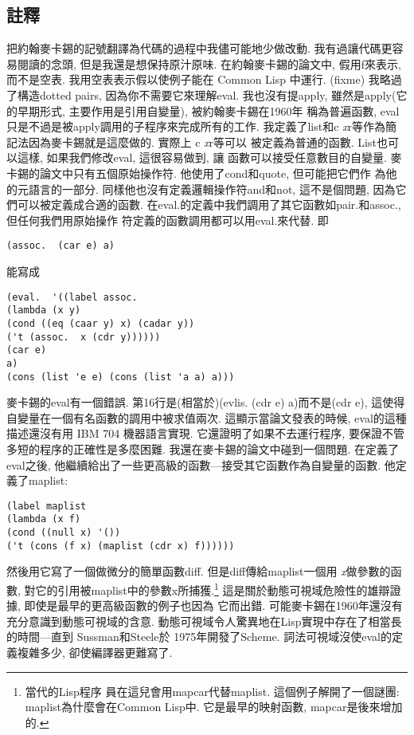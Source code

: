 \documentclass[12pt]{article}
\begin{document}
\begin{CJK}{UTF8}{bsmi}
\section{註釋} 
把約翰麥卡錫的記號翻譯為代碼的過程中我儘可能地少做改動. 
我有過讓代碼更容易閱讀的念頭, 
但是我還是想保持原汁原味. 
在約翰麥卡錫的論文中, 假用f來表示, 
而不是空表. 
我用空表表示假以使例子能在
Common Lisp 中運行. 
(fixme) 
我略過了構造dotted 
pairs, 
因為你不需要它來理解eval. 
我也沒有提apply, 
雖然是apply(它的早期形式, 
主要作用是引用自變量), 
被約翰麥卡錫在1960年 
稱為普遍函數, 
eval只是不過是被apply調用的子程序來完成所有的工作. 
我定義了list和c{\it 
x}r等作為簡記法因為麥卡錫就是這麼做的. 
實際上 
c{\it 
x}r等可以 
被定義為普通的函數. 
List也可以這樣, 
如果我們修改eval, 
這很容易做到, 
讓 
函數可以接受任意數目的自變量. 
麥卡錫的論文中只有五個原始操作符. 
他使用了cond和quote, 但可能把它們作 
為他的元語言的一部分. 
同樣他也沒有定義邏輯操作符and和not, 
這不是個問題, 
因為它們可以被定義成合適的函數. 
在eval.的定義中我們調用了其它函數如pair.和assoc., 但任何我們用原始操作 
符定義的函數調用都可以用eval.來代替. 
即 
\begin{verbatim} 
(assoc.  (car e) a) 
\end{verbatim} 
能寫成 
\begin{verbatim} 
(eval.  '((label assoc. 
(lambda (x y) 
(cond ((eq (caar y) x) (cadar y)) 
('t (assoc.  x (cdr y)))))) 
(car e) 
a) 
(cons (list 'e e) (cons (list 'a a) a))) 
\end{verbatim} 
麥卡錫的eval有一個錯誤. 
第16行是(相當於)(evlis.  (cdr e) a)而不是(cdr e), 
這使得自變量在一個有名函數的調用中被求值兩次. 
這顯示當論文發表的時候, 
eval的這種描述還沒有用 IBM 704 機器語言實現. 
它還證明了如果不去運行程序, 
要保證不管多短的程序的正確性是多麼困難. 
我還在麥卡錫的論文中碰到一個問題. 
在定義了eval之後, 
他繼續給出了一些更高級的函數---接受其它函數作為自變量的函數. 
他定義了maplist: 
\begin{verbatim} 
(label maplist 
(lambda (x f) 
(cond ((null x) '()) 
('t (cons (f x) (maplist (cdr x) f)))))) 
\end{verbatim} 
然後用它寫了一個做微分的簡單函數diff. 
但是diff傳給maplist一個用{\it 
x}做參數的函數, 
對它的引用被maplist中的參數x所捕獲.\footnote{當代的Lisp程序 
員在這兒會用mapcar代替maplist. 
這個例子解開了一個謎團: 
maplist為什麼會在Common 
Lisp中. 
它是最早的映射函數, 
mapcar是後來增加的.} 
這是關於動態可視域危險性的雄辯證據, 
即使是最早的更高級函數的例子也因為 
它而出錯. 
可能麥卡錫在1960年還沒有充分意識到動態可視域的含意. 
動態可視域令人驚異地在Lisp實現中存在了相當長的時間---直到
Sussman和Steele於 
1975年開發了Scheme. 
詞法可視域沒使eval的定義複雜多少, 
卻使編譯器更難寫了. 
\newpage 
\end{CJK} 
\end{document}
